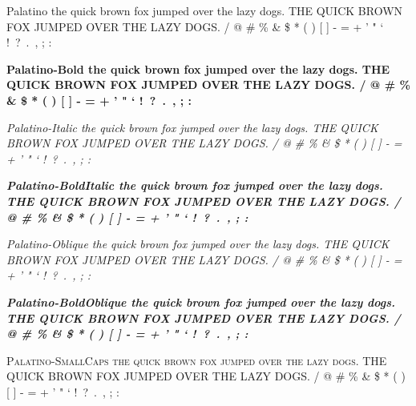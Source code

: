 \documentclass{article}
\begin{document}
{\selectfont
Palatino \newline
the quick brown fox jumped over the lazy dogs. \newline
THE QUICK BROWN FOX JUMPED OVER THE LAZY DOGS.  / @ \# \% \& \$ * ( ) [ ] - = + ' " ` !\ ?\ .\ , ; :  \par
{\bfseries
Palatino-Bold \newline
the quick brown fox jumped over the lazy dogs. \newline
THE QUICK BROWN FOX JUMPED OVER THE LAZY DOGS.  / @ \# \% \& \$ * ( ) [ ] - = + ' " ` !\ ?\ .\ , ; : } \par
{\itshape
Palatino-Italic \newline
the quick brown fox jumped over the lazy dogs. \newline
THE QUICK BROWN FOX JUMPED OVER THE LAZY DOGS.  / @ \# \% \& \$ * ( ) [ ] - = + ' " ` !\ ?\ .\ , ; : } \par
{\bfseries \itshape
Palatino-BoldItalic \newline
the quick brown fox jumped over the lazy dogs. \newline
THE QUICK BROWN FOX JUMPED OVER THE LAZY DOGS.  / @ \# \% \& \$ * ( ) [ ] - = + ' " ` !\ ?\ .\ , ; : } \par
{\slshape
Palatino-Oblique \newline
the quick brown fox jumped over the lazy dogs. \newline
THE QUICK BROWN FOX JUMPED OVER THE LAZY DOGS.  / @ \# \% \& \$ * ( ) [ ] - = + ' " ` !\ ?\ .\ , ; : } \par
{\bfseries \slshape
Palatino-BoldOblique \newline
the quick brown fox jumped over the lazy dogs. \newline
THE QUICK BROWN FOX JUMPED OVER THE LAZY DOGS.  / @ \# \% \& \$ * ( ) [ ] - = + ' " ` !\ ?\ .\ , ; : } \par
{\scshape
Palatino-SmallCaps \newline
the quick brown fox jumped over the lazy dogs. \newline
THE QUICK BROWN FOX JUMPED OVER THE LAZY DOGS.  / @ \# \% \& \$ * ( ) [ ] - = + ' " ` !\ ?\ .\ , ; : } \par
}
\end{document}
